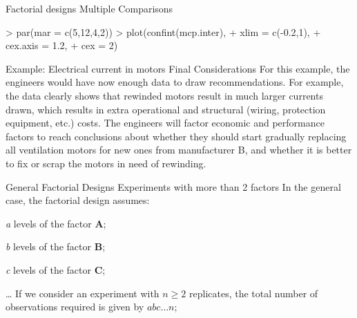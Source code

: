 \documentclass[t]{beamer}
\begin{document}

\begin{ftstf}
{Factorial designs}
{Multiple Comparisons}
\begin{rcode}
> par(mar = c(5,12,4,2))
> plot(confint(mcp.inter), 
+      xlim       = c(-0.2,1),
+      cex.axis   = 1.2,
+      cex        = 2)
\end{rcode}
\end{ftstf}


\begin{ftst}
{Example: Electrical current in motors}
{Final Considerations}
For this example, the engineers would have now enough data to draw recommendations. For example, the data clearly shows that rewinded motors result in much larger currents drawn, which results in extra operational and structural (wiring, protection equipment, etc.) costs.
\vone
The engineers will factor economic and performance factors to reach conclusions about whether they should start gradually replacing all ventilation motors for new ones from manufacturer B, and whether it is better to fix or scrap the motors in need of rewinding.
\end{ftst}


\begin{ftst}
{General Factorial Designs}
{Experiments with more than 2 factors}
In the general case, the factorial design assumes:

\bitems \textit{a} levels of the factor \textbf{A};
\item \textit{b} levels of the factor \textbf{B};
\item \textit{c} levels of the factor \textbf{C};
\item\ldots
\eitem
\vhalf
If we consider an experiment with $n\geq 2$ replicates, the total number of observations required is given by $abc\ldots n$;
\end{ftst}
\end{document}
